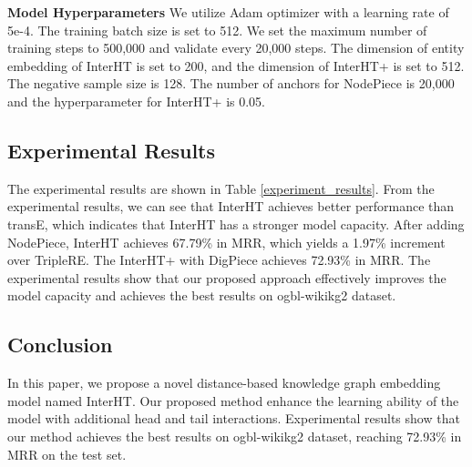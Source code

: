\documentclass[11pt]{article}
\begin{document}
\noindent\textbf{Model Hyperparameters} 
We utilize Adam optimizer with a learning rate of 5e-4. The training batch size is set to 512. We set the maximum number of training steps to 500,000 and validate every 20,000 steps. The dimension of entity embedding of InterHT is set to 200, and the dimension of InterHT+ is set to 512. The negative sample size is 128. The number of anchors for NodePiece is 20,000 and the hyperparameter  for InterHT+ is 0.05.



\subsection{Experimental Results}
The experimental results are shown in Table \ref{experiment_results}. From the experimental results, we can see that InterHT achieves better performance than transE, which indicates that InterHT has a stronger model capacity. After adding NodePiece, InterHT achieves 67.79\% in MRR, which yields a 1.97\% increment over TripleRE. The InterHT+ with DigPiece achieves 72.93\% in MRR. The experimental results show that our proposed approach effectively improves the model capacity and achieves the best results on ogbl-wikikg2 dataset.


\subsection{Conclusion}
In this paper, we propose a novel distance-based knowledge graph embedding model named InterHT. Our proposed method enhance the learning ability of the model with additional head and tail interactions. Experimental results show that our method achieves the best results on ogbl-wikikg2 dataset, reaching 72.93\% in MRR on the test set.




\end{document}

